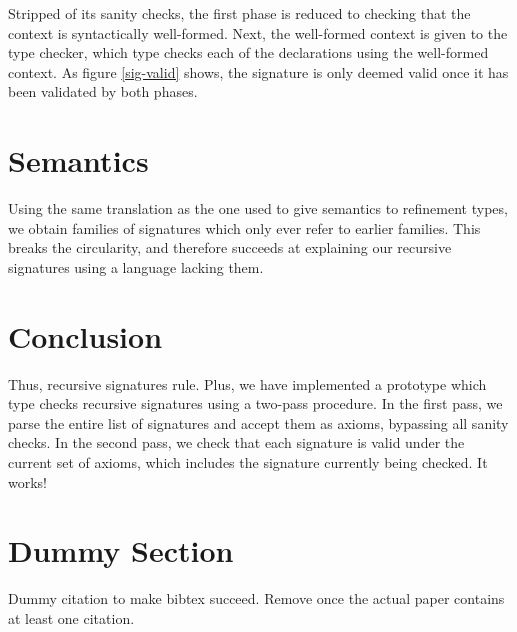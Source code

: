 \documentclass{article}
\begin{document}
Stripped of its sanity checks, the first phase is reduced to checking that the context is syntactically well-formed. Next, the well-formed context is given to the type checker, which type checks each of the declarations using the well-formed context. As figure \ref{sig-valid} shows, the signature is only deemed valid once it has been validated by both phases.

\section{Semantics}\label{Semantics}
Using the same translation as the one used to give semantics to refinement types, we obtain families of signatures which only ever refer to earlier families. This breaks the circularity, and therefore succeeds at explaining our recursive signatures using a language lacking them.

\section{Conclusion}\label{Conclusion}
Thus, recursive signatures rule. Plus, we have implemented a prototype which type checks recursive signatures using a two-pass procedure. In the first pass, we parse the entire list of signatures and accept them as axioms, bypassing all sanity checks. In the second pass, we check that each signature is valid under the current set of axioms, which includes the signature currently being checked. It works!

\section{Dummy Section}
Dummy citation \cite{kienzle2006challenge} to make bibtex succeed. Remove once the actual paper contains at least one citation.



\end{document}

